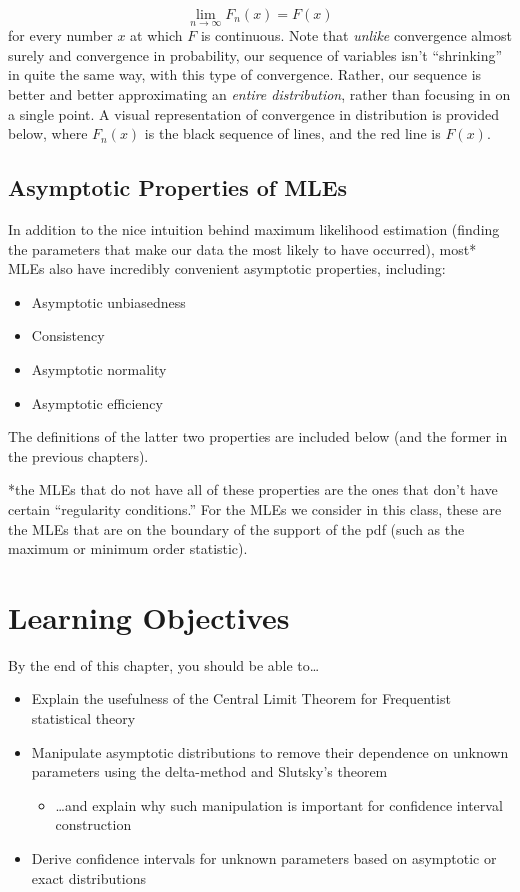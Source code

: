 \documentclass[
  letterpaper,
  DIV=11,
  numbers=noendperiod]{scrreprt}
\providecommand{\tightlist}{%
  \setlength{\itemsep}{0pt}\setlength{\parskip}{0pt}}\usepackage{longtable,booktabs,array}
\begin{document}
\[
\lim_{n \to \infty} F_n(x) = F(x)
\]for every number \(x\) at which \(F\) is continuous. Note that
\emph{unlike} convergence almost surely and convergence in probability,
our sequence of variables isn't ``shrinking'' in quite the same way,
with this type of convergence. Rather, our sequence is better and better
approximating an \emph{entire distribution}, rather than focusing in on
a single point. A visual representation of convergence in distribution
is provided below, where \(F_n(x)\) is the black sequence of lines, and
the red line is \(F(x)\).

\subsection*{Asymptotic Properties of
MLEs}\label{asymptotic-properties-of-mles}

In addition to the nice intuition behind maximum likelihood estimation
(finding the parameters that make our data the most likely to have
occurred), most* MLEs also have incredibly convenient asymptotic
properties, including:

\begin{itemize}
\item
  Asymptotic unbiasedness
\item
  Consistency
\item
  Asymptotic normality
\item
  Asymptotic efficiency
\end{itemize}

The definitions of the latter two properties are included below (and the
former in the previous chapters).

*the MLEs that do not have all of these properties are the ones that
don't have certain ``regularity conditions.'' For the MLEs we consider
in this class, these are the MLEs that are on the boundary of the
support of the pdf (such as the maximum or minimum order statistic).

\section{Learning Objectives}\label{learning-objectives-5}

By the end of this chapter, you should be able to\ldots{}

\begin{itemize}
\item
  Explain the usefulness of the Central Limit Theorem for Frequentist
  statistical theory
\item
  Manipulate asymptotic distributions to remove their dependence on
  unknown parameters using the delta-method and Slutsky's theorem

  \begin{itemize}
  \tightlist
  \item
    \ldots and explain why such manipulation is important for confidence
    interval construction
  \end{itemize}
\item
  Derive confidence intervals for unknown parameters based on asymptotic
  or exact distributions
\end{itemize}
\end{document}
